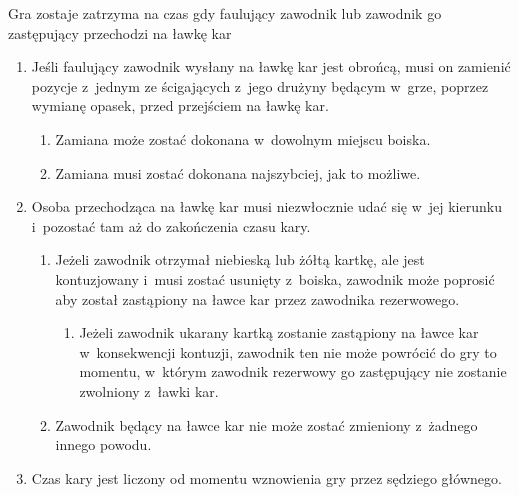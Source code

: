 \documentclass[12pt,a4paper]{article}
\renewcommand{\paragraph}[1]{
  \oldparagraph{#1}%
  \leftskip2.8cm
}
\begin{document}
\paragraph{Przejście na ławkę kar}
Gra zostaje zatrzyma na czas
gdy faulujący zawodnik lub zawodnik go zastępujący przechodzi na ławkę
kar

\begin{enumerate}
	\item
	      Jeśli faulujący zawodnik wysłany na ławkę kar jest obrońcą, musi on
	      zamienić pozycje z~jednym ze ścigających z~jego drużyny będącym w~grze, poprzez wymianę opasek, przed przejściem na ławkę kar.

	      \begin{enumerate}
		      \item
		            Zamiana może zostać dokonana w~dowolnym miejscu boiska.
		      \item
		            Zamiana musi zostać dokonana najszybciej, jak to możliwe.
	      \end{enumerate}
	\item
	      Osoba przechodząca na ławkę kar musi niezwłocznie udać się w~jej
	      kierunku i~pozostać tam aż do zakończenia czasu kary.

	      \begin{enumerate}
		      \item
		            Jeżeli zawodnik otrzymał niebieską lub żółtą kartkę, ale jest
		            kontuzjowany i~musi zostać usunięty z~boiska, zawodnik może poprosić
		            aby został zastąpiony na ławce kar przez zawodnika rezerwowego.

		            \begin{enumerate}
			            \item
			                  Jeżeli zawodnik ukarany kartką zostanie zastąpiony na ławce kar w~konsekwencji kontuzji, zawodnik ten nie może powrócić do gry to
			                  momentu, w~którym zawodnik rezerwowy go zastępujący nie zostanie
			                  zwolniony z~ławki kar.
		            \end{enumerate}
		      \item
		            Zawodnik będący na ławce kar nie może zostać zmieniony z~żadnego
		            innego powodu.
	      \end{enumerate}
	\item
	      Czas kary jest liczony od momentu wznowienia gry przez sędziego
	      głównego.
\end{enumerate}
\end{document}
